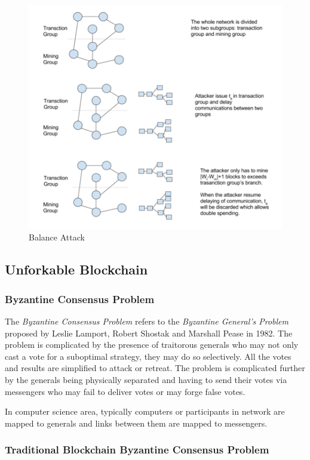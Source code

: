 \documentclass[12pt]{article}
\begin{document}
\begin{figure}
    \centering
    \includegraphics{balance_attack.png}
    \caption{Balance Attack}
    \label{fig:balance_attack}
\end{figure}

\subsection{Unforkable Blockchain}
\label{sec:Unforkable Blockchain}

\subsubsection{Byzantine Consensus Problem}

The \textit{Byzantine Consensus Problem} refers to the \textit{Byzantine General's Problem} proposed by Leslie Lamport, Robert Shostak and Marshall Pease in 1982. The problem is complicated by the presence of traitorous generals who may not only cast a vote for a suboptimal strategy, they may do so selectively. All the votes and results are simplified to attack or retreat. The problem is complicated further by the generals being physically separated and having to send their votes via messengers who may fail to deliver votes or may forge false votes\cite{lamport1982byzantine}.

In computer science area, typically computers or participants in network are mapped to generals and links between them are mapped to messengers.

\subsubsection{Traditional Blockchain Byzantine Consensus Problem}
\end{document}
